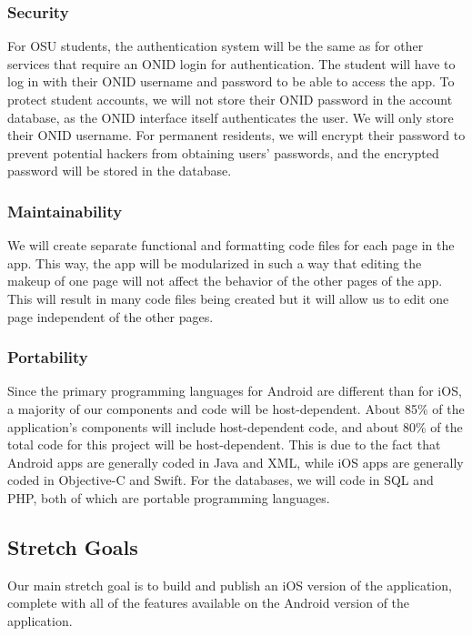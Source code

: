 \documentclass[draftclsnofoot, onecolumn, 10pt, compsoc]{IEEEtran}
\begin{document}
			\subsubsection{Security}
				For OSU students, the authentication system will be the same as for other services that require an ONID login for authentication. The student will have to log in with their ONID username and password to be able to access the app. To protect student accounts, we will not store their ONID password in the account database, as the ONID interface itself authenticates the user. We will only store their ONID username. For permanent residents, we will encrypt their password to prevent potential hackers from obtaining users' passwords, and the encrypted password will be stored in the database.

			\subsubsection{Maintainability}
				We will create separate functional and formatting code files for each page in the app. This way, the app will be modularized in such a way that editing the makeup of one page will not affect the behavior of the other pages of the app. This will result in many code files being created but it will allow us to edit one page independent of the other pages.

			\subsubsection{Portability}
				Since the primary programming languages for Android are different than for iOS, a majority of our components and code will be host-dependent. About 85\% of the application's components will include host-dependent code, and about 80\% of the total code for this project will be host-dependent. This is due to the fact that Android apps are generally coded in Java and XML, while iOS apps are generally coded in Objective-C and Swift. For the databases, we will code in SQL and PHP, both of which are portable programming languages.

		\subsection{Stretch Goals}
			Our main stretch goal is to build and publish an iOS version of the application, complete with all of the features available on the Android version of the application.
\end{document}
